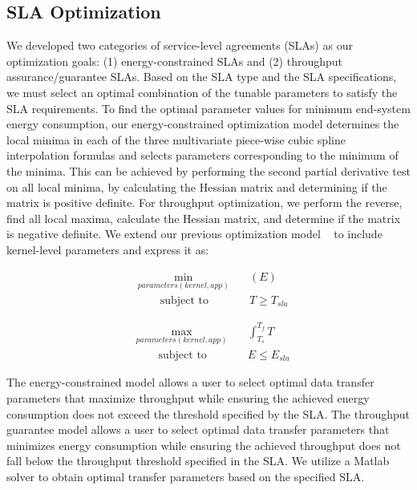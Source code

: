 \documentclass[conference]{IEEEtran}
\begin{document}
\subsection{SLA Optimization}
We developed two categories of service-level agreements (SLAs) as our optimization goals: (1) energy-constrained SLAs and (2) throughput assurance/guarantee SLAs. Based on the SLA type and the SLA specifications, we must select an optimal combination of the tunable parameters to satisfy the SLA requirements. To find the optimal parameter values for minimum end-system energy consumption, our energy-constrained optimization model determines the local minima in each of the three multivariate piece-wise cubic spline interpolation formulas and selects parameters corresponding to the minimum of the minima. This can be achieved by performing the second partial derivative test on all local minima, by calculating the Hessian matrix and determining if the matrix is positive definite. For throughput optimization, we perform the reverse, find all local maxima, calculate the Hessian matrix, and determine if the matrix is negative definite. We extend our previous optimization model ~\cite{nine2018greendataflow} to include kernel-level parameters and express it as:


\begin{equation}
\begin{aligned}
& \min_{parameters(kernel,app)} \quad & (E) \\
& \qquad \textrm{subject to} \quad  &   T \geq T_{sla} 
\end{aligned}
\end{equation}

\begin{equation}
\begin{aligned}
& \max_{parameters(kernel,app)} \quad & \int_{T_s}^{T_f} T  \\
& \qquad \textrm{subject to} \quad & E \leq E_{sla} 
\end{aligned}
\end{equation}


The energy-constrained model allows a user to select optimal data transfer parameters that maximize throughput while ensuring the achieved energy consumption does not exceed the threshold specified by the SLA. The throughput guarantee model allows a user to select optimal data transfer parameters that minimizes energy consumption while ensuring the achieved throughput does not fall below the throughput threshold specified in the SLA. We utilize a Matlab solver to obtain optimal transfer parameters based on the specified SLA.
\end{document}
